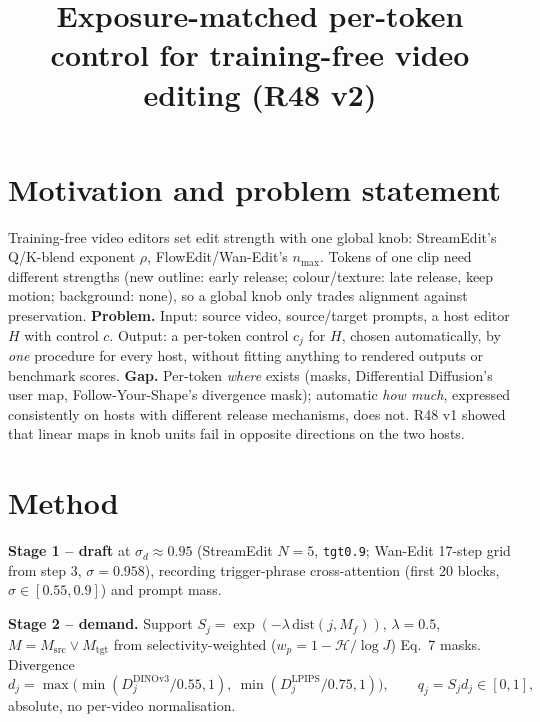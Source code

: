 \documentclass{article}
\title{Exposure-matched per-token control for training-free video editing (R48 v2)}
\begin{document}
\maketitle

\section{Motivation and problem statement}
Training-free video editors set edit strength with one global knob: StreamEdit's Q/K-blend exponent $\rho$, FlowEdit/Wan-Edit's $n_{\max}$. Tokens of one clip need different strengths (new outline: early release; colour/texture: late release, keep motion; background: none), so a global knob only trades alignment against preservation.
\textbf{Problem.} Input: source video, source/target prompts, a host editor $H$ with control $c$. Output: a per-token control $c_j$ for $H$, chosen automatically, by \emph{one} procedure for every host, without fitting anything to rendered outputs or benchmark scores.
\textbf{Gap.} Per-token \emph{where} exists (masks, Differential Diffusion's user map, Follow-Your-Shape's divergence mask); automatic \emph{how much}, expressed consistently on hosts with different release mechanisms, does not. R48 v1 showed that linear maps in knob units fail in opposite directions on the two hosts.

\section{Method}
\textbf{Stage 1 -- draft} at $\sigma_d\approx0.95$ (StreamEdit $N=5$, \texttt{tgt0.9}; Wan-Edit 17-step grid from step 3, $\sigma=0.958$), recording trigger-phrase cross-attention (first 20 blocks, $\sigma\in[0.55,0.9]$) and prompt mass.

\textbf{Stage 2 -- demand.} Support $S_j=\exp(-\lambda\,\mathrm{dist}(j,M_f))$, $\lambda=0.5$, $M=M_{\mathrm{src}}\lor M_{\mathrm{tgt}}$ from selectivity-weighted ($w_p=1-\mathcal H/\log J$) Eq.~7 masks. Divergence
\[
d_j=\max\!\big(\min(D^{\mathrm{DINOv3}}_j/0.55,1),\ \min(D^{\mathrm{LPIPS}}_j/0.75,1)\big),\qquad q_j=S_j d_j\in[0,1],
\]
absolute, no per-video normalisation.
\end{document}
